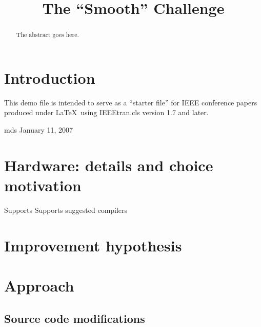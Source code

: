 \documentclass[conference]{IEEEtran}
\begin{document}
\title{The ``Smooth'' Challenge}


\author{
 \and
{} \and
{}
}

\maketitle
\begin{abstract}
The abstract goes here.
\end{abstract}
\IEEEpeerreviewmaketitle

\section{Introduction}
This demo file is intended to serve as a ``starter file''
for IEEE conference papers produced under \LaTeX\ using
IEEEtran.cls version 1.7 and later.

\hfill mds 
\hfill January 11, 2007

\section{Hardware: details and choice motivation}
Supports 
Supports suggested compilers


\section{Improvement hypothesis}


\section{Approach}
	\subsection{Source code modifications}
\end{document}
